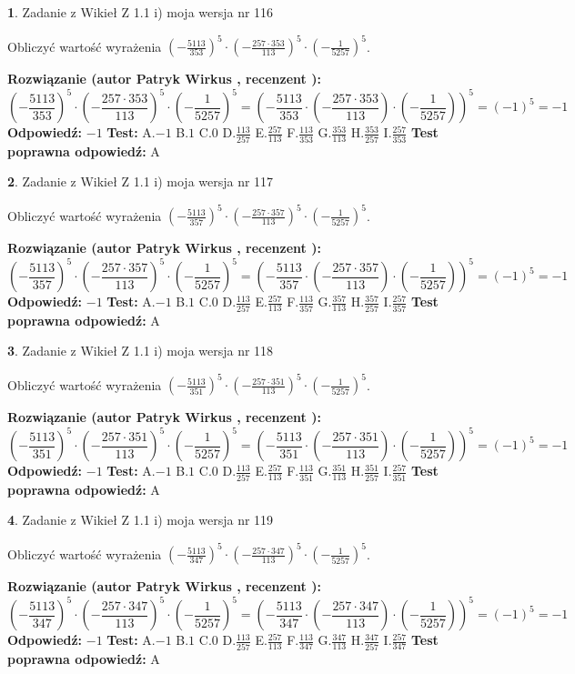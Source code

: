 \documentclass[12pt, a4paper]{article}
\theoremstyle{definition} %
\newtheorem{zad}{}
\newcommand{\zadStart}[1]{\begin{zad}#1\newline}
\newcommand{\zadStop}{\end{zad}}
\newcommand{\rozwStart}[2]{\noindent \textbf{Rozwiązanie (autor #1 , recenzent #2): }\newline}
\newcommand{\rozwStop}{\newline}
\newcommand{\odpStart}{\noindent \textbf{Odpowiedź:}\newline}
\newcommand{\odpStop}{\newline}
\newcommand{\testStart}{\noindent \textbf{Test:}\newline}
\newcommand{\testStop}{\newline}
\newcommand{\kluczStart}{\noindent \textbf{Test poprawna odpowiedź:}\newline}
\newcommand{\kluczStop}{\newline}
\begin{document}
\zadStart{Zadanie z Wikieł Z 1.1 i) moja wersja nr 116}

Obliczyć wartość wyrażenia $(-\frac{5113}{353})^{5} \cdot (-\frac{257 \cdot 353}{113})^{5} \cdot (-\frac{1}{5257})^{5}$.
\zadStop
\rozwStart{Patryk Wirkus}{}
$$(-\frac{5113}{353})^{5} \cdot (-\frac{257 \cdot 353}{113})^{5} \cdot (-\frac{1}{5257})^{5} = (-\frac{5113}{353} \cdot (-\frac{257 \cdot 353}{113}) \cdot (-\frac{1}{5257}))^{5} = (-1)^{5} = -1$$
\rozwStop
\odpStart
$-1$
\odpStop
\testStart
A.$-1$ B.$1$ C.$0$ D.$\frac{113}{257}$ E.$\frac{257}{113}$
F.$\frac{113}{353}$ G.$\frac{353}{113}$
H.$\frac{353}{257}$
I.$\frac{257}{353}$
\testStop
\kluczStart
A
\kluczStop



\zadStart{Zadanie z Wikieł Z 1.1 i) moja wersja nr 117}

Obliczyć wartość wyrażenia $(-\frac{5113}{357})^{5} \cdot (-\frac{257 \cdot 357}{113})^{5} \cdot (-\frac{1}{5257})^{5}$.
\zadStop
\rozwStart{Patryk Wirkus}{}
$$(-\frac{5113}{357})^{5} \cdot (-\frac{257 \cdot 357}{113})^{5} \cdot (-\frac{1}{5257})^{5} = (-\frac{5113}{357} \cdot (-\frac{257 \cdot 357}{113}) \cdot (-\frac{1}{5257}))^{5} = (-1)^{5} = -1$$
\rozwStop
\odpStart
$-1$
\odpStop
\testStart
A.$-1$ B.$1$ C.$0$ D.$\frac{113}{257}$ E.$\frac{257}{113}$
F.$\frac{113}{357}$ G.$\frac{357}{113}$
H.$\frac{357}{257}$
I.$\frac{257}{357}$
\testStop
\kluczStart
A
\kluczStop



\zadStart{Zadanie z Wikieł Z 1.1 i) moja wersja nr 118}

Obliczyć wartość wyrażenia $(-\frac{5113}{351})^{5} \cdot (-\frac{257 \cdot 351}{113})^{5} \cdot (-\frac{1}{5257})^{5}$.
\zadStop
\rozwStart{Patryk Wirkus}{}
$$(-\frac{5113}{351})^{5} \cdot (-\frac{257 \cdot 351}{113})^{5} \cdot (-\frac{1}{5257})^{5} = (-\frac{5113}{351} \cdot (-\frac{257 \cdot 351}{113}) \cdot (-\frac{1}{5257}))^{5} = (-1)^{5} = -1$$
\rozwStop
\odpStart
$-1$
\odpStop
\testStart
A.$-1$ B.$1$ C.$0$ D.$\frac{113}{257}$ E.$\frac{257}{113}$
F.$\frac{113}{351}$ G.$\frac{351}{113}$
H.$\frac{351}{257}$
I.$\frac{257}{351}$
\testStop
\kluczStart
A
\kluczStop



\zadStart{Zadanie z Wikieł Z 1.1 i) moja wersja nr 119}

Obliczyć wartość wyrażenia $(-\frac{5113}{347})^{5} \cdot (-\frac{257 \cdot 347}{113})^{5} \cdot (-\frac{1}{5257})^{5}$.
\zadStop
\rozwStart{Patryk Wirkus}{}
$$(-\frac{5113}{347})^{5} \cdot (-\frac{257 \cdot 347}{113})^{5} \cdot (-\frac{1}{5257})^{5} = (-\frac{5113}{347} \cdot (-\frac{257 \cdot 347}{113}) \cdot (-\frac{1}{5257}))^{5} = (-1)^{5} = -1$$
\rozwStop
\odpStart
$-1$
\odpStop
\testStart
A.$-1$ B.$1$ C.$0$ D.$\frac{113}{257}$ E.$\frac{257}{113}$
F.$\frac{113}{347}$ G.$\frac{347}{113}$
H.$\frac{347}{257}$
I.$\frac{257}{347}$
\testStop
\kluczStart
A
\kluczStop
\end{document}
